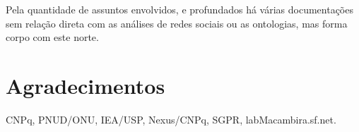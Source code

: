 \documentclass[a4paper,openright,12pt]{report} %
\begin{document}
Pela quantidade de assuntos envolvidos,
e profundados
há várias documentações sem relação direta com as análises
de redes sociais ou as ontologias, mas forma corpo com este norte.

\section*{Agradecimentos}
CNPq, PNUD/ONU, IEA/USP, Nexus/CNPq, SGPR, labMacambira.sf.net.

\begin{singlespace}
\vspace{-5cm}
%

  \titleformat{\chapter}[display]
  {\normalfont\bfseries\filcenter}
  {-15ex \LARGE\thechapter}
  {-15ex}
  {%
	  \vspace{-9ex}
  \LARGE}
  [%
  {\titlerule[1pt]}]

  \vspace{-15ex}
\addcontentsline{toc}{chapter}{Referências}
\renewcommand{\bibname}{Referências}
  \vspace{-15ex}
  \vspace{-5cm}
  {
\linespread{1}


}
\end{singlespace}
\end{document}

